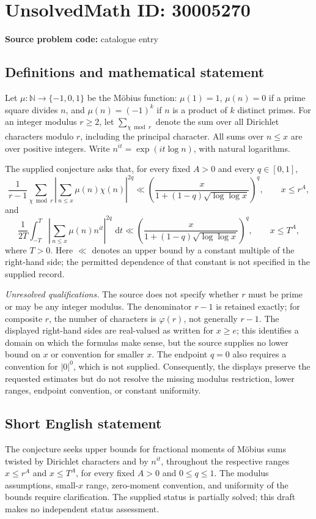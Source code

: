 \documentclass[11pt]{article}
\newcommand{\N}{\mathbb{N}}
\newcommand{\dd}{\,\mathrm{d}}
\begin{document}
\section*{UnsolvedMath ID: 30005270}
\textbf{Source problem code:} catalogue entry
\subsection{Definitions and mathematical statement}
Let \(\mu:\N\to\{-1,0,1\}\) be the Möbius function: \(\mu(1)=1\), \(\mu(n)=0\) if a prime square divides \(n\), and \(\mu(n)=(-1)^k\) if \(n\) is a product of \(k\) distinct primes. For an integer modulus \(r\geq2\), let \(\sum_{\chi\bmod r}\) denote the sum over all Dirichlet characters modulo \(r\), including the principal character. All sums over \(n\leq x\) are over positive integers. Write \(n^{it}=\exp(it\log n)\), with natural logarithms.

The supplied conjecture asks that, for every fixed \(A>0\) and every \(q\in[0,1]\),
\[
\frac{1}{r-1}\sum_{\chi\bmod r}
\left|\sum_{n\leq x}\mu(n)\chi(n)\right|^{2q}
\ll
\left(\frac{x}{1+(1-q)\sqrt{\log\log x}}\right)^q,
\qquad x\leq r^A,
\]
and
\[
\frac{1}{2T}\int_{-T}^{T}
\left|\sum_{n\leq x}\mu(n)n^{it}\right|^{2q}\,\dd t
\ll
\left(\frac{x}{1+(1-q)\sqrt{\log\log x}}\right)^q,
\qquad x\leq T^A,
\]
where \(T>0\). Here \(\ll\) denotes an upper bound by a constant multiple of the right-hand side; the permitted dependence of that constant is not specified in the supplied record.

\textit{Unresolved qualifications.} The source does not specify whether \(r\) must be prime or may be any integer modulus. The denominator \(r-1\) is retained exactly; for composite \(r\), the number of characters is \(\varphi(r)\), not generally \(r-1\). The displayed right-hand sides are real-valued as written for \(x\geq e\); this identifies a domain on which the formulas make sense, but the source supplies no lower bound on \(x\) or convention for smaller \(x\). The endpoint \(q=0\) also requires a convention for \(|0|^0\), which is not supplied. Consequently, the displays preserve the requested estimates but do not resolve the missing modulus restriction, lower ranges, endpoint convention, or constant uniformity.
\subsection{Short English statement}
The conjecture seeks upper bounds for fractional moments of Möbius sums twisted by Dirichlet characters and by \(n^{it}\), throughout the respective ranges \(x\leq r^A\) and \(x\leq T^A\), for every fixed \(A>0\) and \(0\leq q\leq1\). The modulus assumptions, small-\(x\) range, zero-moment convention, and uniformity of the bounds require clarification. The supplied status is partially solved; this draft makes no independent status assessment.
\end{document}
